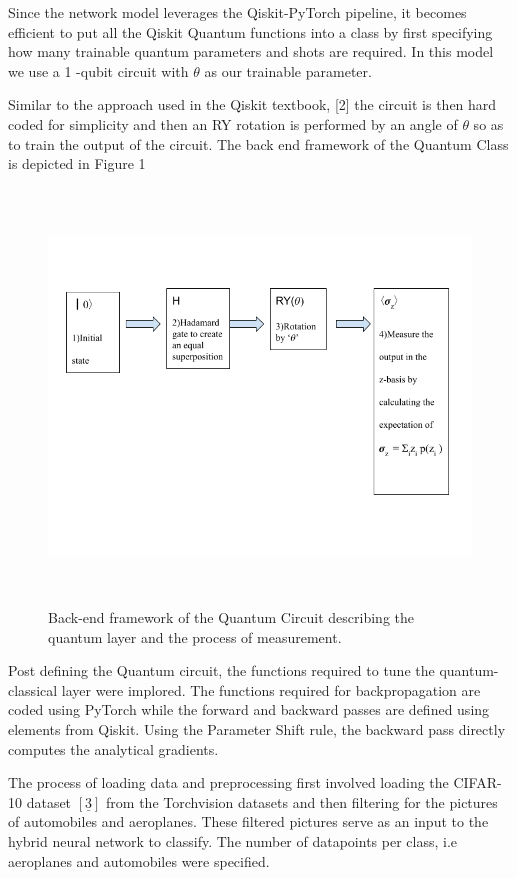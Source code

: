 \documentclass[10pt]{article}
\begin{document}
Since the network model leverages the Qiskit-PyTorch pipeline, it becomes efficient to put all the Qiskit Quantum functions into a class by first specifying how many trainable quantum parameters and shots are required. In this model we use a 1 -qubit circuit with $\theta$ as our trainable parameter.

Similar to the approach used in the Qiskit textbook, [2] the circuit is then hard coded for simplicity and then an RY rotation is performed by an angle of $\theta$ so as to train the output of the circuit. The back end framework of the Quantum Class is depicted in Figure 1

\begin{figure}
    \centering
    \includegraphics[width=15cm, height=11cm]{elias flowchart.png}
    \caption{ Back-end framework of the Quantum Circuit describing the quantum layer and the process of measurement.}
    \label{fig:my_label}
\end{figure}


Post defining the Quantum circuit, the functions required to tune the quantum-classical layer were implored. The functions required for backpropagation are coded using PyTorch while the forward and backward passes are defined using elements from Qiskit. Using the Parameter Shift rule, the backward pass directly computes the analytical gradients.

The process of loading data and preprocessing first involved loading the CIFAR-10 dataset  $[\underline{3}]$ from the Torchvision datasets and then filtering for the pictures of automobiles and aeroplanes. These filtered pictures serve as an input to the hybrid neural network to classify. The number of datapoints per class, i.e aeroplanes and automobiles were specified.
\end{document}
